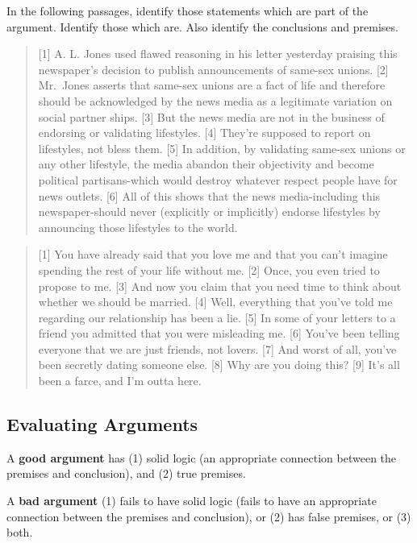 \documentclass[]{article}
\begin{document}
In the following passages, identify those statements which are part of
the argument. Identify those which are. Also identify the conclusions
and premises.

\begin{quote}
{[}1{]} A. L. Jones used flawed reasoning in his letter yesterday
praising this newspaper's decision to publish announcements of same-sex
unions. {[}2{]} Mr.~Jones asserts that same-sex unions are a fact of
life and therefore should be acknowledged by the news media as a
legitimate variation on social partner ships. {[}3{]} But the news media
are not in the business of endorsing or validating lifestyles. {[}4{]}
They're supposed to report on lifestyles, not bless them. {[}5{]} In
addition, by validating same-sex unions or any other lifestyle, the
media abandon their objectivity and become political partisans-which
would destroy whatever respect people have for news outlets. {[}6{]} All
of this shows that the news media-including this newspaper-should never
(explicitly or implicitly) endorse lifestyles by announcing those
lifestyles to the world.
\end{quote}

\begin{quote}
{[}1{]} You have already said that you love me and that you can't
imagine spending the rest of your life without me. {[}2{]} Once, you
even tried to propose to me. {[}3{]} And now you claim that you need
time to think about whether we should be married. {[}4{]} Well,
everything that you've told me regarding our relationship has been a
lie. {[}5{]} In some of your letters to a friend you admitted that you
were misleading me. {[}6{]} You've been telling everyone that we are
just friends, not lovers. {[}7{]} And worst of all, you've been secretly
dating someone else. {[}8{]} Why are you doing this? {[}9{]} It's all
been a farce, and I'm outta here.
\end{quote}

\subsection{Evaluating Arguments}\label{evaluating-arguments}

A \textbf{good argument} has (1) solid logic (an appropriate connection
between the premises and conclusion), and (2) true premises.

A \textbf{bad argument} (1) fails to have solid logic (fails to have an
appropriate connection between the premises and conclusion), or (2) has
false premises, or (3) both.
\end{document}
